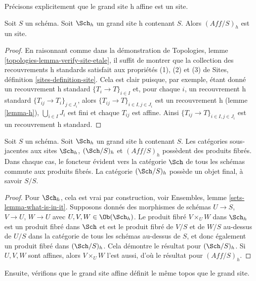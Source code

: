 \noindent
Précisons explicitement que le grand site h affine est un site.

\begin{lemma}
\label{lemma-verify-site-h}
Soit $S$ un schéma. Soit $\Sch_h$ un grand
site h contenant $S$. Alors $(\textit{Aff}/S)_h$ est un site.
\end{lemma}

\begin{proof}
En raisonnant comme dans la démonstration de
Topologies, lemme \ref{topologies-lemma-verify-site-etale},
il suffit de montrer que la collection des recouvrements h standards
satisfait aux propriétés (1), (2) et (3) de
Sites, définition \ref{sites-definition-site}.
Cela est clair puisque, par exemple, étant donné un recouvrement h standard
$\{T_i \to T\}_{i\in I}$ et, pour chaque
$i$, un recouvrement h standard $\{T_{ij} \to T_i\}_{j \in J_i}$, alors
$\{T_{ij} \to T\}_{i \in I, j\in J_i}$ est un recouvrement h
(lemme \ref{lemma-h}), $\bigcup_{i\in I} J_i$ est fini et
chaque $T_{ij}$ est affine. Ainsi $\{T_{ij} \to T\}_{i \in I, j\in J_i}$
est un recouvrement h standard.
\end{proof}

\begin{lemma}
\label{lemma-fibre-products-h}
Soit $S$ un schéma. Soit $\Sch_h$ un grand
site h contenant $S$. Les catégories sous-jacentes aux sites
$\Sch_h$, $(\Sch/S)_h$ et $(\textit{Aff}/S)_h$ possèdent des produits fibrés.
Dans chaque cas, le foncteur évident vers la catégorie $\Sch$ de
tous les schémas commute aux produits fibrés. La catégorie
$(\Sch/S)_h$ possède un objet final, à savoir $S/S$.
\end{lemma}

\begin{proof}
Pour $\Sch_h$, cela est vrai par construction, voir
Ensembles, lemme \ref{sets-lemma-what-is-in-it}.
Supposons donnés des morphismes de schémas $U \to S$, $V \to U$, $W \to U$
avec $U, V, W \in \Ob(\Sch_h)$.
Le produit fibré $V \times_U W$ dans $\Sch_h$
est un produit fibré dans $\Sch$ et
est le produit fibré de $V/S$ et de $W/S$ au-dessus de $U/S$ dans
la catégorie de tous les schémas au-dessus de $S$, et donc également un
produit fibré dans $(\Sch/S)_h$.
Cela démontre le résultat pour $(\Sch/S)_h$.
Si $U, V, W$ sont affines, alors $V \times_U W$ l'est aussi, d'où le
résultat pour $(\textit{Aff}/S)_h$.
\end{proof}

\noindent
Ensuite, vérifions que le grand site affine définit le même
topos que le grand site.

